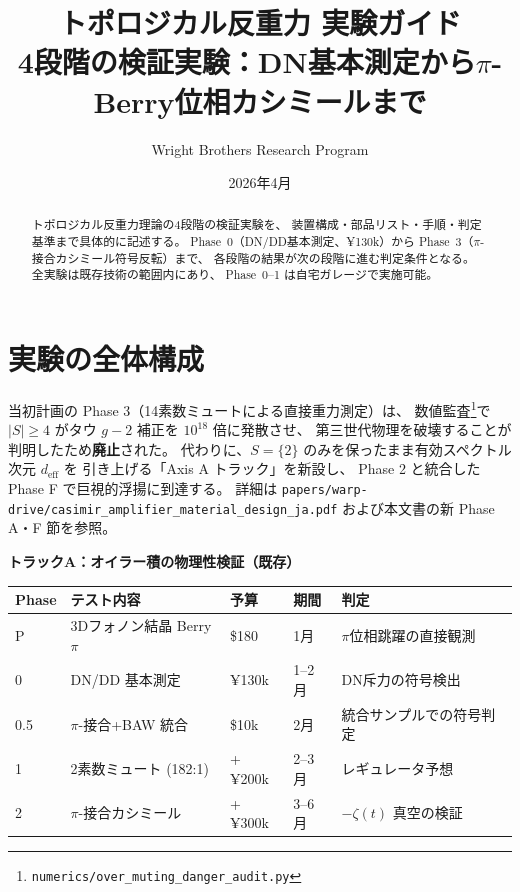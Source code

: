 \documentclass[11pt,a4paper]{article}
\title{トポロジカル反重力 実験ガイド\\[6pt]
\large 4段階の検証実験：DN基本測定から$\pi$-Berry位相カシミールまで}
\author{Wright Brothers Research Program}
\date{2026年4月}
\begin{document}
\maketitle

\begin{abstract}
トポロジカル反重力理論の4段階の検証実験を、
装置構成・部品リスト・手順・判定基準まで具体的に記述する。
Phase~0（DN/DD基本測定、¥130k）から
Phase~3（$\pi$-接合カシミール符号反転）まで、
各段階の結果が次の段階に進む判定条件となる。
全実験は既存技術の範囲内にあり、
Phase~0--1 は自宅ガレージで実施可能。
\end{abstract}

\tableofcontents
\newpage

\section{実験の全体構成}

\begin{tcolorbox}[colback=blue!5,colframe=blue!60!black,title=2026年4月更新：二本立て並列トラック]
当初計画の Phase 3（14素数ミュートによる直接重力測定）は、
数値監査\footnote{\texttt{numerics/over\_muting\_danger\_audit.py}}で
$|S|\geq 4$ がタウ $g-2$ 補正を $10^{18}$ 倍に発散させ、
第三世代物理を破壊することが判明したため\textbf{廃止}された。
代わりに、$S=\{2\}$ のみを保ったまま有効スペクトル次元 $d_{\mathrm{eff}}$ を
引き上げる「Axis A トラック」を新設し、
Phase 2 と統合した Phase F で巨視的浮揚に到達する。
詳細は \texttt{papers/warp-drive/casimir\_amplifier\_material\_design\_ja.pdf}
および本文書の新 Phase A・F 節を参照。
\end{tcolorbox}

\textbf{トラックA：オイラー積の物理性検証（既存）}
\begin{center}
\begin{tabular}{llllp{4.5cm}}
\toprule
Phase & テスト内容 & 予算 & 期間 & 判定 \\
\midrule
P    & 3Dフォノン結晶 Berry$\pi$ & \$180 & 1月 & $\pi$位相跳躍の直接観測 \\
0    & DN/DD 基本測定            & ¥130k  & 1--2月 & DN斥力の符号検出 \\
0.5  & $\pi$-接合+BAW 統合        & \$10k  & 2月  & 統合サンプルでの符号判定 \\
1    & 2素数ミュート (182:1)      & +¥200k & 2--3月 & レギュレータ予想 \\
2    & $\pi$-接合カシミール        & +¥300k & 3--6月 & $-\zeta(t)$ 真空の検証 \\
\bottomrule
\end{tabular}
\end{center}
\end{document}
